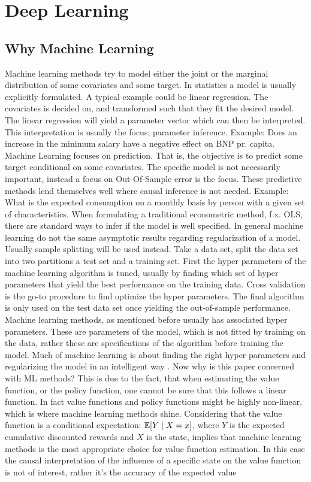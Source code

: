 \section{Deep Learning}
\label{sec:deep_learning}


\subsection{Why Machine Learning}

Machine learning methods try to model either the joint or the marginal distribution of some covariates and some target. In statistics a model is usually explicitly formulated. A typical example could be linear regression. The covariates is decided on, and transformed such that they fit the desired model. The linear regression will yield a parameter vector which can then be interpreted. This interpretation is usually the focus; parameter inference. Example: Does an increase in the minimum salary have a negative effect on BNP pr. capita. Machine Learning focuses on prediction. That is, the objective is to predict some target conditional on some covariates. The specific model is not necessarily important, instead a focus on Out-Of-Sample error is the focus. These predictive methods lend themselves well where causal inference is not needed. Example: What is the expected consumption on a monthly basis by person with a given set of characteristics. When formulating a traditional econometric method, f.x. OLS, there are standard ways to infer if the model is well specified. In general machine learning do not the same asymptotic results regarding regularization of a model. Usually sample splitting will be used instead. Take a data set, split the data set into two partitions a test set and a training set. First the hyper parameters of the machine learning algorithm is tuned, usually by finding which set of hyper parameters that yield the best performance on the training data. Cross validation is the go-to procedure to find optimize the hyper parameters. The final algorithm is only used on the test data set once yielding the out-of-sample performance. Machine learning methods, as mentioned before usually has associated hyper parameters. These are parameters of the model, which is not fitted by training on the data, rather these are specifications of the algorithm before training the model. Much of machine learning is about finding the right hyper parameters and regularizing the model in an intelligent way \parencite{friedman_elements_2001}. Now why is this paper concerned with ML methods? This is due to the fact, that when estimating the value function, or the policy function, one cannot be sure that this follows a linear function. In fact value functions and policy functions might be highly non-linear, which is where machine learning methods shine. Considering that the value function is a conditional expectation: $ \mathbb{E}[Y \mid X=x]$, where $Y$ is the expected cumulative discounted rewards and $X$ is the state, implies that machine learning methods is the most appropriate choice for value function estimation.  In this case the causal interpretation of the influence of a specific state on the value function is not of interest, rather it's the accuracy of the expected value 